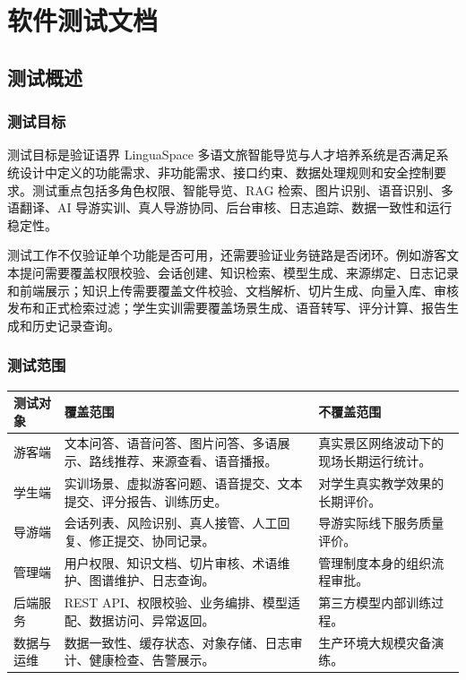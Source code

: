 \chapter{软件测试文档}

\section{测试概述}

\subsection{测试目标}

测试目标是验证语界 LinguaSpace 多语文旅智能导览与人才培养系统是否满足系统设计中定义的功能需求、非功能需求、接口约束、数据处理规则和安全控制要求。测试重点包括多角色权限、智能导览、RAG 检索、图片识别、语音识别、多语翻译、AI 导游实训、真人导游协同、后台审核、日志追踪、数据一致性和运行稳定性。

测试工作不仅验证单个功能是否可用，还需要验证业务链路是否闭环。例如游客文本提问需要覆盖权限校验、会话创建、知识检索、模型生成、来源绑定、日志记录和前端展示；知识上传需要覆盖文件校验、文档解析、切片生成、向量入库、审核发布和正式检索过滤；学生实训需要覆盖场景生成、语音转写、评分计算、报告生成和历史记录查询。

\subsection{测试范围}

\begin{longtable}{p{3.1cm}p{5.1cm}p{5.0cm}}
\toprule
测试对象 & 覆盖范围 & 不覆盖范围 \\
\midrule
游客端 & 文本问答、语音问答、图片问答、多语展示、路线推荐、来源查看、语音播报。 & 真实景区网络波动下的现场长期运行统计。 \\
学生端 & 实训场景、虚拟游客问题、语音提交、文本提交、评分报告、训练历史。 & 对学生真实教学效果的长期评价。 \\
导游端 & 会话列表、风险识别、真人接管、人工回复、修正提交、协同记录。 & 导游实际线下服务质量评价。 \\
管理端 & 用户权限、知识文档、切片审核、术语维护、图谱维护、日志查询。 & 管理制度本身的组织流程审批。 \\
后端服务 & REST API、权限校验、业务编排、模型适配、数据访问、异常返回。 & 第三方模型内部训练过程。 \\
数据与运维 & 数据一致性、缓存状态、对象存储、日志审计、健康检查、告警展示。 & 生产环境大规模灾备演练。 \\
\bottomrule
\end{longtable}

